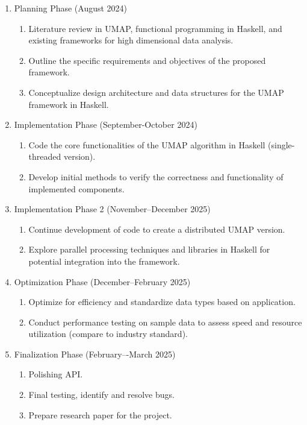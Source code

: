 \documentclass[10pt,letterpaper]{article}
\providecommand{\tightlist}{%
  \setlength{\itemsep}{0pt}\setlength{\parskip}{0pt}}
\begin{document}
\begin{multicols}{2}
\begin{enumerate}
  \tightlist
    \item Planning Phase (August 2024)
\begin{enumerate} \tightlist
    \item Literature review in UMAP, functional programming in Haskell, and existing frameworks for high dimensional data analysis.
    \item Outline the specific requirements and objectives of the proposed framework.
    \item Conceptualize design architecture and data structures for the UMAP framework in Haskell.
\end{enumerate}
\item Implementation Phase (September-October 2024)
\begin{enumerate} \tightlist
    \item Code the core functionalities of the UMAP algorithm in Haskell (single-threaded version).
    \item Develop initial methods to verify the correctness and functionality of implemented components.
\end{enumerate}
\item Implementation Phase 2 (November--December 2025)
\begin{enumerate} \tightlist
    \item Continue development of code to create a distributed UMAP version.
    \item Explore parallel processing techniques and libraries in Haskell for potential integration into the framework.
\end{enumerate}
\item Optimization Phase (December--February 2025)
\begin{enumerate} \tightlist
    \item Optimize for efficiency and standardize data types based on application.
    \item Conduct performance testing on sample data to assess speed and resource utilization (compare to industry standard).
\end{enumerate}
\item Finalization Phase (February–-March 2025)
\begin{enumerate} \tightlist
    \item Polishing API.
    \item Final testing, identify and resolve bugs.
    \item Prepare research paper for the project.
\end{enumerate}
\end{enumerate}

\end{multicols}
\end{document}
